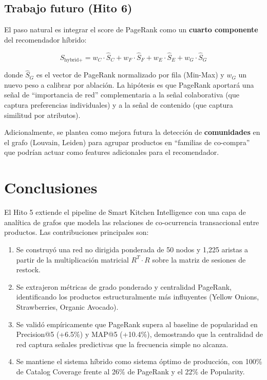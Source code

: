 \documentclass[12pt,a4paper]{article}
\begin{document}
\subsection{Trabajo futuro (Hito 6)}

El paso natural es integrar el score de PageRank como un \textbf{cuarto componente} del recomendador híbrido:

\begin{equation}
    S_{\text{hybrid+}} = w_C \cdot \hat{S}_C + w_F \cdot \hat{S}_F + w_E \cdot \hat{S}_E + w_G \cdot \hat{S}_G
\end{equation}

donde $\hat{S}_G$ es el vector de PageRank normalizado por fila (Min-Max) y $w_G$ un nuevo peso a calibrar por ablación. La hipótesis es que PageRank aportará una señal de ``importancia de red'' complementaria a la señal colaborativa (que captura preferencias individuales) y a la señal de contenido (que captura similitud por atributos).

Adicionalmente, se plantea como mejora futura la detección de \textbf{comunidades} en el grafo (Louvain, Leiden) para agrupar productos en ``familias de co-compra'' que podrían actuar como features adicionales para el recomendador.

\section{Conclusiones}

El Hito 5 extiende el pipeline de Smart Kitchen Intelligence con una capa de analítica de grafos que modela las relaciones de co-ocurrencia transaccional entre productos. Las contribuciones principales son:

\begin{enumerate}
    \item Se construyó una red no dirigida ponderada de 50 nodos y 1,225 aristas a partir de la multiplicación matricial $R^T \cdot R$ sobre la matriz de sesiones de restock.

    \item Se extrajeron métricas de grado ponderado y centralidad PageRank, identificando los productos estructuralmente más influyentes (Yellow Onions, Strawberries, Organic Avocado).

    \item Se validó empíricamente que PageRank supera al baseline de popularidad en Precision@5 (+6.5\%) y MAP@5 (+10.4\%), demostrando que la centralidad de red captura señales predictivas que la frecuencia simple no alcanza.

    \item Se mantiene el sistema híbrido como sistema óptimo de producción, con 100\% de Catalog Coverage frente al 26\% de PageRank y el 22\% de Popularity.
\end{enumerate}
\end{document}
